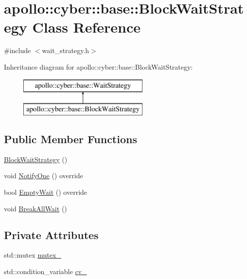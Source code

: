 \hypertarget{classapollo_1_1cyber_1_1base_1_1BlockWaitStrategy}{\section{apollo\-:\-:cyber\-:\-:base\-:\-:Block\-Wait\-Strategy Class Reference}
\label{classapollo_1_1cyber_1_1base_1_1BlockWaitStrategy}
}


{\ttfamily \#include $<$wait\-\_\-strategy.\-h$>$}

Inheritance diagram for apollo\-:\-:cyber\-:\-:base\-:\-:Block\-Wait\-Strategy\-:\begin{figure}[H]
\begin{center}
\leavevmode
\includegraphics[height=2.000000cm]{classapollo_1_1cyber_1_1base_1_1BlockWaitStrategy}
\end{center}
\end{figure}
\subsection*{Public Member Functions}
\begin{DoxyCompactItemize}
\item 
\hyperlink{classapollo_1_1cyber_1_1base_1_1BlockWaitStrategy_a3a84cd077ae77dfc1abfe13401fa4cea}{Block\-Wait\-Strategy} ()
\item 
void \hyperlink{classapollo_1_1cyber_1_1base_1_1BlockWaitStrategy_ae8f8c929ddcc0973e18337a12535eb76}{Notify\-One} () override
\item 
bool \hyperlink{classapollo_1_1cyber_1_1base_1_1BlockWaitStrategy_a9be79b6f4cb8f78fb1715e2f221ebdff}{Empty\-Wait} () override
\item 
void \hyperlink{classapollo_1_1cyber_1_1base_1_1BlockWaitStrategy_a7f883544b4a59a5b250e7f9bddd7c2b7}{Break\-All\-Wait} ()
\end{DoxyCompactItemize}
\subsection*{Private Attributes}
\begin{DoxyCompactItemize}
\item 
std\-::mutex \hyperlink{classapollo_1_1cyber_1_1base_1_1BlockWaitStrategy_adca22a19b9f79e8a952001bba1286fb0}{mutex\-\_\-}
\item 
std\-::condition\-\_\-variable \hyperlink{classapollo_1_1cyber_1_1base_1_1BlockWaitStrategy_a9bc9e755055037e813f8a180ef4f609d}{cv\-\_\-}
\end{DoxyCompactItemize}


